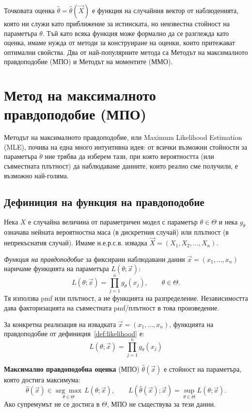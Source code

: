 Точковата оценка $\hat{\theta} = \hat{\theta}(\vec{X})$ е функция на случайния вектор от наблюденията, която ни служи като приближение за истинската, но неизвестна стойност на параметъра $\theta$. Тъй като всяка функция може формално да се разглежда като оценка, имаме нужда от методи за конструиране на оценки, които притежават оптимални свойства. Два от най-популярните метода са Методът на максималното правдоподобие (МПО) и Методът на моментите (ММО).

\section{Метод на максималното правдоподобие (МПО)}

Методът на максималното правдоподобие, или Maximum Likelihood Estimation (MLE), почива на една много интуитивна идея: от всички възможни стойности за параметъра $\theta$ ние трябва да изберем тази, при която вероятността (или съвместната плътност) да наблюдаваме данните, които реално сме получили, е възможно най-голяма.

\subsection{Дефиниция на функция на правдоподобие}
Нека $X$ е случайна величина от параметричен модел с параметър $\theta\in\Theta$ и
нека $g_\theta$ означава нейната вероятностна маса (в дискретния случай) или
плътност (в непрекъснатия случай). Имаме н.е.р.с.в. извадка
$\vec{X} = (X_1, X_2, \dots, X_n)$.

\begin{keydefn}\label{def:likelihood}
\emph{Функция на правдоподобие} за фиксирани наблюдавани данни
$\vec{x}=(x_1,\dots,x_n)$ наричаме функцията на параметъра
$L(\theta;\vec{x})$:
\[
    L(\theta;\vec{x}) = \prod_{j=1}^n g_\theta(x_j), \qquad \theta\in\Theta .
\]
Тя използва pmf или плътност, а не функцията на разпределение. Независимостта
дава факторизацията на съвместната pmf/плътност в това произведение.
\end{keydefn}

За конкретна реализация на извадката $\vec{x} = (x_1, \dots, x_n)$, функцията на правдоподобие от дефиниция~\ref{def:likelihood} е:
\[
    L(\theta;\vec{x}) = \prod_{j=1}^n g_\theta(x_j)
\]

\textbf{Максимално правдоподобна оценка} (МПО) $\hat{\theta}(\vec{x})$ е стойност на параметъра, която достига максимума:
\[
    \hat{\theta}(\vec{x})\in\underset{\theta\in\Theta}{\arg\max}\,L(\theta;\vec{x}),
    \qquad L(\hat{\theta}(\vec{x});\vec{x})=\sup_{\theta\in\Theta}L(\theta;\vec{x}).
\]
Ако супремумът не се достига в $\Theta$, МПО не съществува за тези данни.

